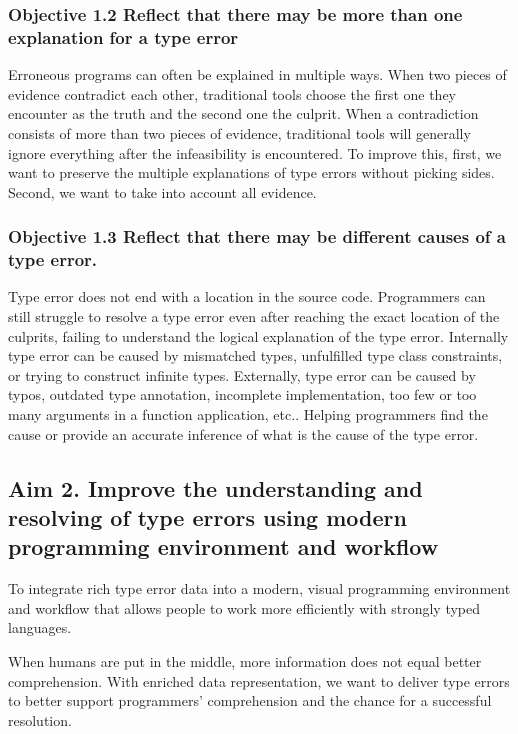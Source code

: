 \subsubsection{Objective 1.2 Reflect that there may be more than one explanation for a type error}

Erroneous programs can often be explained in multiple ways. When two pieces of evidence contradict each other, traditional tools choose the first one they encounter as the truth and the second one the culprit. When a contradiction consists of more than two pieces of evidence, traditional tools will generally ignore everything after the infeasibility is encountered. To improve this, first, we want to preserve the multiple explanations of type errors without picking sides. Second, we want to take into account all evidence.

\subsubsection{Objective 1.3 Reflect that there may be different causes of a type error.}

Type error does not end with a location in the source code. Programmers can still struggle to resolve a type error even after reaching the exact location of the culprits, failing to understand the logical explanation of the type error. Internally type error can be caused by mismatched types, unfulfilled type class constraints, or trying to construct infinite types. Externally, type error can be caused by typos, outdated type annotation, incomplete implementation, too few or too many arguments in a function application, etc.. Helping programmers find the cause or provide an accurate inference of what is the cause of the type error.

\subsection{Aim 2. Improve the understanding and resolving of type errors using modern programming environment and workflow}

To integrate rich type error data into a modern, visual programming environment and workflow that allows people to work more efficiently with strongly typed languages.


When humans are put in the middle, more information does not equal better comprehension. With enriched data representation, we want to deliver type errors to better support programmers’ comprehension and the chance for a successful resolution.

